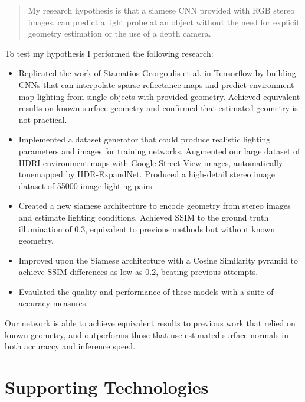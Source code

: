 \documentclass[ %
                    author={Gavin Parker},
                supervisor={Dr. Neill Campbell},
                    degree={MEng},
                     title={Deep Siamese Networks for Illumination Estimation from Stereo Images},
                  subtitle={},
                      type={research},
                      year={2018} ]{dissertation}
\begin{document}
\begin{quote}
My research hypothesis is that a siamese CNN provided with RGB stereo images, can predict a light probe at an object without the need for explicit geometry estimation or the use of a depth camera.
\end{quote}

To test my hypothesis I performed the following research:

\noindent
\begin{itemize}
\item Replicated the work of Stamatios Georgoulis et al. in Tensorflow by building CNNs that can interpolate sparse reflectance maps and predict environment map lighting from single objects with provided geometry. Achieved equivalent results on known surface geometry and confirmed that estimated geometry is not practical.
\item Implemented a dataset generator that could produce realistic lighting parameters and images for training networks. Augmented our large dataset of HDRI environment maps with Google Street View images, automatically tonemapped by HDR-ExpandNet. Produced a high-detail stereo image dataset of 55000 image-lighting pairs.
\item Created a new siamese architecture to encode geometry from stereo images and estimate lighting conditions. Achieved SSIM to the ground truth illumination of 0.3, equivalent to previous methods but without known geometry.
\item Improved upon the Siamese architecture with a Cosine Similarity pyramid to achieve SSIM differences as low as 0.2, beating previous attempts.
\item Evaulated the quality and performance of these models with a suite of accuracy measures.
\end{itemize}

Our network is able to achieve equivalent results to previous work that relied on known geometry, and outperforms those that use estimated surface normals in both accuraccy and inference speed.

\chapter*{Supporting Technologies}
\end{document}
